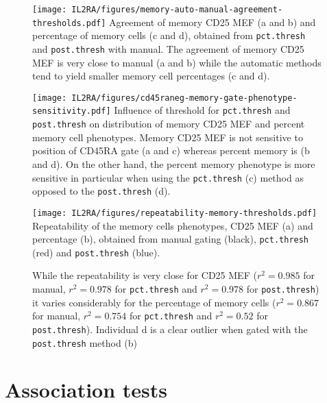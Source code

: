 \begin{figure}[h]
 \centering
 \texttt{[image: IL2RA/figures/memory-auto-manual-agreement-thresholds.pdf]}
 {Agreement of memory CD25 MEF (a and b) and percentage of memory cells (c and d), obtained from \texttt{pct.thresh} and \texttt{post.thresh} with manual.}
 {
   The agreement of memory CD25 MEF is very close to manual (a and b) while the automatic methods tend to yield smaller memory cell percentages (c and d).
 }
\end{figure} 

\begin{figure}[h]
  \texttt{[image: IL2RA/figures/cd45raneg-memory-gate-phenotype-sensitivity.pdf]}
{ Influence of threshold for \texttt{pct.thresh} and \texttt{post.thresh} on distribution of memory CD25 MEF and percent memory cell phenotypes. }
{
  Memory CD25 MEF is not sensitive to position of CD45RA gate (a and c) whereas percent memory is (b and d).
  On the other hand, the percent memory phenotype is more sensitive in particular when using the \texttt{pct.thresh} (c)
  method as opposed to the \texttt{post.thresh} (d).
}
\end{figure}

\begin{figure}[h]
\centering
  \texttt{[image: IL2RA/figures/repeatability-memory-thresholds.pdf]}
{Repeatability of the memory cells phenotypes, CD25 MEF (a) and percentage (b), obtained from manual gating (black), \texttt{pct.thresh} (red) and \texttt{post.thresh} (blue).}
{
  While the repeatability is very close for CD25 MEF
  ($r^2=0.985$ for manual, $r^2=0.978$ for \texttt{pct.thresh} and $r^2=0.978$ for \texttt{post.thresh})
  it varies considerably for the percentage of memory cells
  ($r^2=0.867$ for manual, $r^2=0.754$ for \texttt{pct.thresh} and $r^2=0.52$ for \texttt{post.thresh}).
  Individual d is a clear outlier when gated with the \texttt{post.thresh} method (b)

}
\end{figure}




\section{Association tests}

